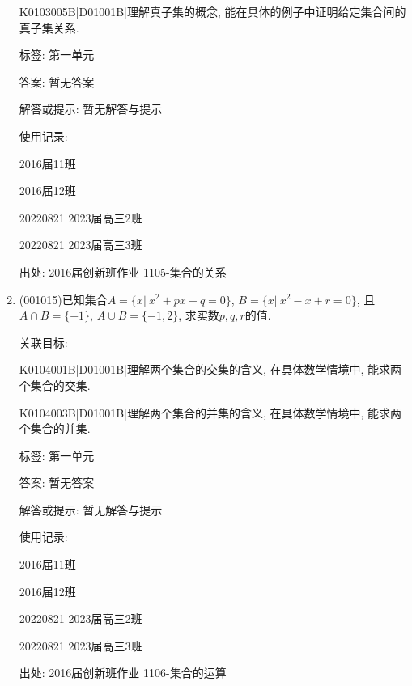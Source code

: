 \documentclass[10pt,a4paper]{article}
\begin{document}
\begin{enumerate}[1.]
K0103005B|D01001B|理解真子集的概念, 能在具体的例子中证明给定集合间的真子集关系.



标签: 第一单元

答案: 暂无答案

解答或提示: 暂无解答与提示

使用记录:

2016届11班	

2016届12班	

20220821	2023届高三2班	

20220821	2023届高三3班	


出处: 2016届创新班作业	1105-集合的关系
\item { (001015)}已知集合$A=\{x|\ x^2+px+q=0\}$, $B=\{x|\ x^2-x+r=0\}$, 且$A\cap B=\{-1\}$, $A\cup B=\{-1,2\}$, 求实数$p,q,r$的值.


关联目标:

K0104001B|D01001B|理解两个集合的交集的含义, 在具体数学情境中, 能求两个集合的交集.

K0104003B|D01001B|理解两个集合的并集的含义, 在具体数学情境中, 能求两个集合的并集.



标签: 第一单元

答案: 暂无答案

解答或提示: 暂无解答与提示

使用记录:

2016届11班	

2016届12班	

20220821	2023届高三2班	

20220821	2023届高三3班	


出处: 2016届创新班作业	1106-集合的运算
\end{enumerate}
\end{document}
